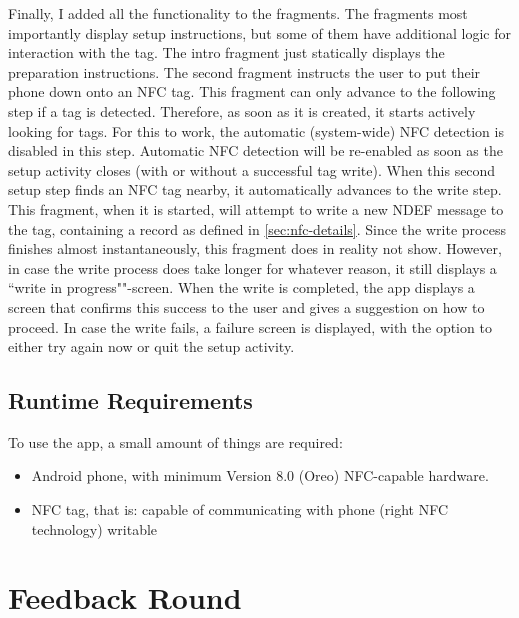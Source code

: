 \documentclass[conference]{IEEEtran}
\begin{document}
Finally, I added all the functionality to the fragments. The fragments most importantly display setup instructions, but some of them have additional logic for interaction with the tag. The intro fragment just statically displays the preparation instructions. The second fragment instructs the user to put their phone down onto an NFC tag. This fragment can only advance to the following step if a tag is detected. Therefore, as soon as it is created, it starts actively looking for tags. For this to work, the automatic (system-wide) NFC detection is disabled in this step. Automatic NFC detection will be re-enabled as soon as the setup activity closes (with or without a successful tag write). When this second setup step finds an NFC tag nearby, it automatically advances to the write step. This fragment, when it is started, will attempt to write a new NDEF message to the tag, containing a record as defined in \cref{sec:nfc-details}. Since the write process finishes almost instantaneously, this fragment does in reality not show. However, in case the write process does take longer for whatever reason, it still displays a ``write in progress""-screen. When the write is completed, the app displays a screen that confirms this success to the user and gives a suggestion on how to proceed. In case the write fails, a failure screen is displayed, with the option to either try again now or quit the setup activity.

\subsection{Runtime Requirements}
To use the app, a small amount of things are required:

\begin{itemize}
	\item Android phone, with
	\subitem minimum Version 8.0 (Oreo)
	\subitem NFC-capable hardware.
	\item NFC tag, that is:
	\subitem capable of communicating with phone (right NFC technology)
	\subitem writable
\end{itemize}

\section{Feedback Round}
\end{document}
